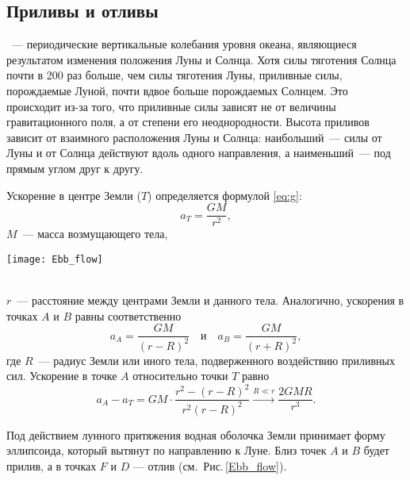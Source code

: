 \subsection{Приливы и отливы}

~--- периодические вертикальные колебания уровня океана, являющиеся результатом изменения положения Луны и Солнца. Хотя силы тяготения Солнца почти в 200 раз больше, чем силы тяготения Луны, приливные силы, порождаемые Луной, почти вдвое больше порождаемых Солнцем. Это происходит из-за того, что приливные силы зависят не от величины гравитационного поля, а от степени его неоднородности. Высота приливов зависит от взаимного расположения Луны и Солнца: наибольший~---  силы от Луны и от Солнца действуют вдоль одного направления, а наименьший~--- под прямым углом друг к другу.

\begin{minipage}{.24\tw}
	Ускорение в центре Земли ($T$) определяется формулой \eqref{eq:g}:
	\begin{equation*}
		a_T=\frac{G M}{r^2},
	\end{equation*}
	$M$~--- масса возмущающего тела,
\end{minipage}
\hfill
\begin{minipage}{0.74\tw}
	\vspace{-.5pc}
	\texttt{[image: Ebb\_flow]}
	\label{Ebb_flow}
\end{minipage}\\[-0.5pc]

$r$~--- расстояние между центрами Земли и данного тела. Аналогично, ускорения в точках $A$ и $B$ равны соответственно
\begin{equation}
	a_A = \frac{G M}{(r - R)^2} \quad \text{и} \quad a_B = \frac{GM}{(r + R)^2},
\end{equation}
где $R$~--- радиус Земли или иного тела, подверженного воздействию приливных сил. Ускорение в точке $A$ относительно точки $T$ равно
\begin{equation}
    a_A - a_T = GM \cdot \frac{r^2 - (r - R)^2}{r^2 (r - R)^2} \xrightarrow{R \ll r} \frac{2 G M R}{r^3}.
	\label{eq:ebb-force}
\end{equation}

Под действием лунного притяжения водная оболочка Земли принимает форму
эллипсоида, который вытянут по направлению к Луне. Близ точек $A$ и $B$ будет
прилив, а в точках $F$ и $D$ --- отлив (см.~Рис.\,\ref{Ebb_flow}).
